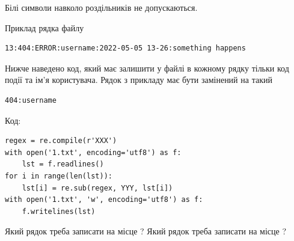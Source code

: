 \documentclass[12pt, ukrainian]{article}
\begin{document}
{Білі символи навколо роздільників не допускаються.

Приклад рядка файлу



\begin{verbatim}
13:404:ERROR:username:2022-05-05 13-26:something happens
\end{verbatim}


Нижче наведено код, який має залишити у файлі в кожному рядку тільки код події та ім'я користувача. Рядок з прикладу має бути замінений на такий



\begin{verbatim}
404:username
\end{verbatim}




Код:



\begin{verbatim}
regex = re.compile(r'XXX')
with open('1.txt', encoding='utf8') as f:
    lst = f.readlines()
for i in range(len(lst)):
    lst[i] = re.sub(regex, YYY, lst[i])
with open('1.txt', 'w', encoding='utf8') as f:
    f.writelines(lst)
\end{verbatim}





Який рядок треба записати на місце  ?
Який рядок треба записати на місце  ?\par

}
\newpage
\end{document}
